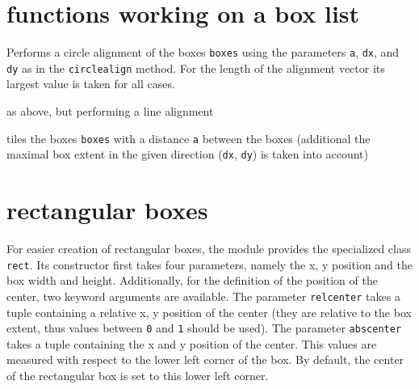 \section{functions working on a box list}

\begin{description}
\raggedright
\item[\texttt{circlealignequal(boxes, a, dx, dy)}:] Performs a circle
alignment of the boxes \verb|boxes| using the parameters \verb|a|,
\verb|dx|, and \verb|dy| as in the \verb|circlealign| method. For the
length of the alignment vector its largest value is taken for all
cases.
\item[\texttt{linealignequal(boxes, a, dx, dy)}:] as above, but
performing a line alignment
\item[\texttt{tile(boxes, a, dx, dy)}:] tiles the boxes \verb|boxes|
with a distance \verb|a| between the boxes (additional the maximal box
extent in the given direction (\verb|dx|, \verb|dy|) is taken into
account)
\end{description}

\section{rectangular boxes}

For easier creation of rectangular boxes, the module provides the
specialized class \verb|rect|. Its constructor first takes four
parameters, namely the x, y position and the box width and height.
Additionally, for the definition of the position of the center, two
keyword arguments are available. The parameter \verb|relcenter| takes
a tuple containing a relative x, y position of the center (they are
relative to the box extent, thus values between \verb|0| and
\verb|1| should be used). The parameter \verb|abscenter| takes a tuple
containing the x and y position of the center. This values are
measured with respect to the lower left corner of the box. By
default, the center of the rectangular box is set to this lower left
corner.

